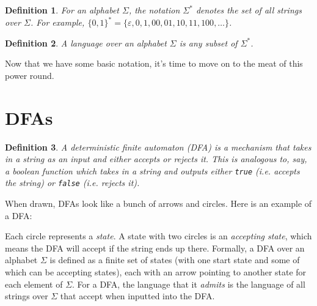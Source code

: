 \documentclass[11pt]{article}
\newtheorem{defn}{Definition}[section]
\begin{document}
\begin{defn}For an alphabet $\Sigma$, the notation $\Sigma^*$ denotes the set of all strings over $\Sigma$. For example, $\{0,1\}^*=\{\varepsilon,0,1,00,01,10,11,100,\dots\}$.\end{defn}

\begin{defn} A \emph{language} over an alphabet $\Sigma$ is any subset of $\Sigma^*$.\end{defn}

Now that we have some basic notation, it's time to move on to the meat of this power round.

\section{DFAs}

\begin{defn}A \emph{deterministic finite automaton} (DFA) is a mechanism that takes in a string as an input and either accepts or rejects it.  This is analogous to, say, a boolean function which takes in a string and outputs either \texttt{true} (i.e. accepts the string) or \texttt{false} (i.e. rejects it).\end{defn}

When drawn, DFAs look like a bunch of arrows and circles.  Here is an example of a DFA:

\begin{center}
\end{center}

Each circle represents a \emph{state}. A state with two circles is an \emph{accepting state}, which means the DFA will accept if the string ends up there. Formally, a DFA over an alphabet $\Sigma$ is defined as a finite set of states (with one start state and some of which can be accepting states), each with an arrow pointing to another state for each element of $\Sigma$. For a DFA, the language that it \emph{admits} is the language of all strings over $\Sigma$ that accept when inputted into the DFA.
\end{document}
